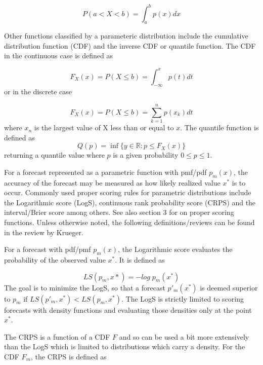 \documentclass{article}\usepackage[]{graphicx}\usepackage[]{color}
\begin{document}
\begin{equation}
  P(a < X < b) = \int_a^b p(x) dx
\end{equation}

Other functions classified by a parameteric distribution include the cumulative
distribution function (CDF) and the inverse CDF or quantile function. The CDF 
in the continuous case is defined as

\begin{equation}
  F_X(x) = P(X \leq b) = \int_{-\infty}^x p(t) dt
\end{equation}
or in the discrete case 

\begin{equation}
\label{eq:dcdf}
  F_X(x) = P(X \leq b) = \sum_{k=1}^n p(x_k) dt
\end{equation}
where $x_n$ is the largest value of X less than or equal to $x$.
The quantile function is defined as
\begin{equation}
  Q(p) = \inf \{ y \in \mathbb{R} : p \leq F_X(x) \}
\end{equation}
returning a quantile value where $p$ is a given probability $0\leq p \leq 1$.

For a forecast represented as a parametric function with pmf/pdf $p_m(x)$, 
the accuracy of the forecast may be measured as how likely realized value $x^*$
is to occur. Commonly used proper scoring rules for parametric distributions
include the Logarithmic score (LogS), 
continuous rank probability score (CRPS) \cite{hersbach2000decomposition}
\cite{alves2013ncep} and the interval/Brier 
score \cite{gneiting2007strictly} among 
others. See also \cite{gneiting2014probabilistic}
section 3 for on proper scoring functions. Unless otherwise noted, the following
definitions/reviews can be found in the review by Krueger.

For a forecast with pdf/pmf $p_m(x)$, the Logarithmic score evaluates the 
probability of the observed value $x^*$. It is defined as

\begin{equation}
  LS(p_m,x*) = -log\;p_m(x^*)
\end{equation}
The goal is to minimize the LogS, so that a forecast $p{'}_m(x^*)$ is deemed 
superior to $p_m$ if
$LS(p{'}_m, x^*) < LS(p_m, x^*)$.
The LogS is strictly limited to scoring forecasts with density functions and
evaluating those densities only at the point $x^*$.

The CRPS is a function of a CDF $F$
and so 
can be used a bit more extensively than the LogS which is limited to 
distributions which carry a density. For the CDF $F_m$, the CRPS is defined as
\end{document}
